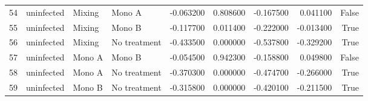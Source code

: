 \begin{tabular}{llllrrrrr}
54 & uninfected & Mixing & Mono A & -0.063200 & 0.808600 & -0.167500 & 0.041100 & False \\
55 & uninfected & Mixing & Mono B & -0.117700 & 0.011400 & -0.222000 & -0.013400 & True \\
56 & uninfected & Mixing & No treatment & -0.433500 & 0.000000 & -0.537800 & -0.329200 & True \\
57 & uninfected & Mono A & Mono B & -0.054500 & 0.942300 & -0.158800 & 0.049800 & False \\
58 & uninfected & Mono A & No treatment & -0.370300 & 0.000000 & -0.474700 & -0.266000 & True \\
59 & uninfected & Mono B & No treatment & -0.315800 & 0.000000 & -0.420100 & -0.211500 & True \\
\bottomrule
\end{tabular}
